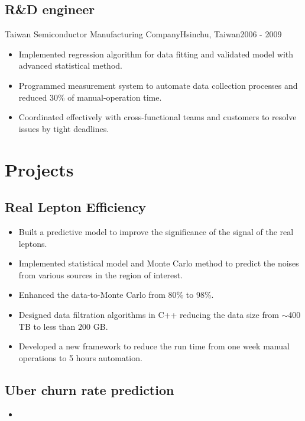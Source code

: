 \documentclass[11pt, letterpaper]{yt_resume}   	%
\begin{document}
\subsection{R\&D engineer}{Taiwan Semiconductor Manufacturing Company}{Hsinchu, Taiwan}{2006 - 2009}
\begin{itemize}
\item Implemented regression algorithm for data fitting and validated model with advanced statistical method.
\item Programmed measurement system to automate data collection processes and reduced 30\% of manual-operation time.
\item Coordinated effectively with cross-functional teams and customers to resolve issues by tight deadlines.
\end{itemize}


\section{Projects}

\subsection{Real Lepton Efficiency}{}{}{}{}
\begin{itemize}
\item Built a predictive model to improve the significance of the signal of the real leptons.
\item Implemented statistical model and Monte Carlo method to predict the noises from various sources in the region of interest.
\item Enhanced the data-to-Monte Carlo from 80\% to 98\%.
\item Designed data filtration algorithms in C++ reducing the data size from $\sim$400 TB to less than 200 GB.
\item Developed a new framework to reduce the run time from one week manual operations to 5 hours automation.
\end{itemize}

\subsection{Uber churn rate prediction}{}{}{}{}
\begin{itemize}
\item
\end{itemize}
\end{document}
